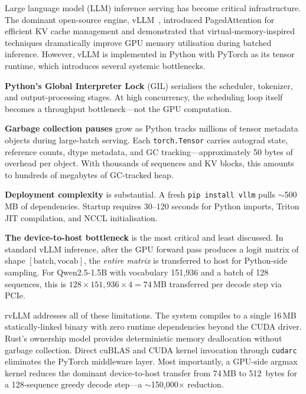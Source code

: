 Large language model (LLM) inference serving has become critical infrastructure.
The dominant open-source engine, vLLM~\cite{kwon2023vllm}, introduced PagedAttention
for efficient KV cache management and demonstrated that virtual-memory-inspired
techniques dramatically improve GPU memory utilisation during batched inference.
However, vLLM is implemented in Python with PyTorch as its tensor runtime, which
introduces several systemic bottlenecks.

\textbf{Python's Global Interpreter Lock} (GIL) serialises the scheduler, tokenizer,
and output-processing stages. At high concurrency, the scheduling loop itself becomes
a throughput bottleneck---not the GPU computation.

\textbf{Garbage collection pauses} grow as Python tracks millions of tensor metadata
objects during large-batch serving. Each \texttt{torch.Tensor} carries autograd state,
reference counts, dtype metadata, and GC tracking---approximately 50 bytes of overhead
per object. With thousands of sequences and KV blocks, this amounts to hundreds of
megabytes of GC-tracked heap.

\textbf{Deployment complexity} is substantial. A fresh \texttt{pip install vllm}
pulls $\sim$500\,MB of dependencies. Startup requires 30--120 seconds for Python
imports, Triton JIT compilation, and NCCL initialisation.

\textbf{The device-to-host bottleneck} is the most critical and least discussed.
In standard vLLM inference, after the GPU forward pass produces a logit matrix of
shape $[\text{batch}, \text{vocab}]$, the \emph{entire matrix} is transferred to
host for Python-side sampling. For Qwen2.5-1.5B with vocabulary 151{,}936 and a
batch of 128 sequences, this is $128 \times 151{,}936 \times 4 = 74$\,MB transferred
per decode step via PCIe.

rvLLM addresses all of these limitations. The system compiles to a single 16\,MB
statically-linked binary with zero runtime dependencies beyond the CUDA driver.
Rust's ownership model provides deterministic memory deallocation without garbage
collection. Direct cuBLAS and CUDA kernel invocation through
\texttt{cudarc}~\cite{cudarc2023} eliminates the PyTorch middleware layer. Most
importantly, a GPU-side argmax kernel reduces the dominant device-to-host transfer
from 74\,MB to 512~bytes for a 128-sequence greedy decode step---a
$\sim$150{,}000$\times$ reduction.

